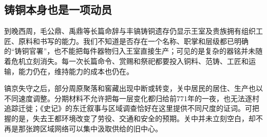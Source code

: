 \subsection{铸铜本身也是一项动员}

到晚西周，毛公鼎、禹鼎等长篇命辞与丰镐铸铜遗存仍显示王室及贵族拥有组织工匠、原料和书写的能力。我们不知道是否存在一个名称、职掌和层级都已明确的“铸铜官署”，也不能把每件器物归入王室直接生产；可见的是复杂的器铭并未随着危机立刻消失。每一次长篇命令、赏赐和祭祀都要投入铜料、范铸、工匠和运输，能力仍在，维持能力的成本也仍在。

镐京失守之后，部分周原聚落和窖藏出现中断或转变，关中居民的居住、生产也以不同速度调整。分期材料不允许把每一层变化都归给前771年的一夜，也无法逐村追踪迁徙；《史记》的东迁叙事与区域调查恰好在这里提供不同尺度的证词。可把握的是，失去王都环境改变了劳役、交通和安全的预期。关中并未立刻空白，却不再是那张跨区域网络可以集中汲取供给的旧中心。
